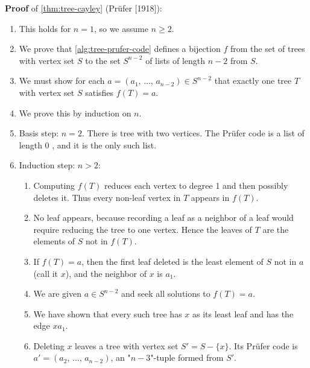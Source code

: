 \documentclass[../src/handouts/main.tex]{subfiles}
\begin{document}
\textbf{Proof} of \cref{thm:tree-cayley} (Prüfer [1918]):
\begin{enumerate}
  \item This holds for $n = 1$, so we assume $n \geq 2$.
  \item We prove that \cref{alg:tree-prufer-code} defines a bijection $f$ from the set of trees with vertex set $S$ to the set $S^{n - 2}$ of lists of length $n - 2$ from $S$.
  \item We must show for each $a = \left(a_1,\, \ldots,\, a_{n - 2}\right) \in S^{n - 2}$ that exactly one tree $T$ with vertex set $S$ satisfies $f(T) = a$.
  \item We prove this by induction on $n$.
  \item Basis step: $n = 2$. There is tree with two vertices. The Prüfer code is a list of length 0 , and it is the only such list.
  \item Induction step: $n > 2$:
  \begin{enumerate}
    \item Computing $f(T)$ reduces each vertex to degree 1 and then possibly deletes it. Thus every non-leaf vertex in $T$ appears in $f(T)$.
    \item No leaf appears, because recording a leaf as a neighbor of a leaf would require reducing the tree to one vertex. Hence the leaves of $T$ are the elements of $S$ not in $f(T)$.
    \item If $f(T) = a$, then the first leaf deleted is the least element of $S$ not in $a$ (call it $x$), and the neighbor of $x$ is $a_1$.
    \item We are given $a \in S^{n - 2}$ and seek all solutions to $f(T)=a$.
    \item We have shown that every such tree has $x$ as its least leaf and has the edge $x a_1$.
    \item Deleting $x$ leaves a tree with vertex set $S' = S - \{x\}$. Its Prüfer code is $a' = \left( a_2,\, \ldots,\, a_{n - 2} \right)$, an "$n - 3$"-tuple formed from $S'$.
  \end{enumerate}
\end{enumerate}
\end{document}
